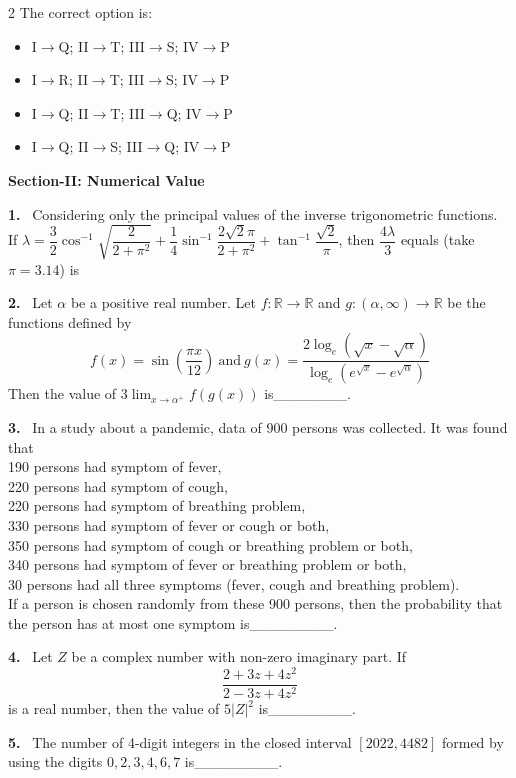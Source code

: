 \documentclass[10pt]{extarticle}
\newcommand{\sect}[1]{\par\smallskip\noindent\textbf{#1}\par}
\newcommand{\qn}[1]{\par\smallskip\noindent\textbf{#1.}~}
\newenvironment{qoptions}{\begin{itemize}[leftmargin=1.8em,itemsep=1pt,topsep=2pt,label={}]}{\end{itemize}}
\newcommand{\opt}[2]{\item[(#1)] #2}
\begin{document}
\begin{multicols}{2}
The correct option is:
\begin{qoptions}
\opt{A}{I$\to$Q; II$\to$T; III$\to$S; IV$\to$P}
\opt{B}{I$\to$R; II$\to$T; III$\to$S; IV$\to$P}
\opt{C}{I$\to$Q; II$\to$T; III$\to$Q; IV$\to$P}
\opt{D}{I$\to$Q; II$\to$S; III$\to$Q; IV$\to$P}
\end{qoptions}

\sect{Section-II: Numerical Value}

\qn{1} Considering only the principal values of the inverse trigonometric functions.\\
If $\lambda = \dfrac32\cos^{-1}\sqrt{\dfrac{2}{2+\pi^2}} + \dfrac14\sin^{-1}\dfrac{2\sqrt2\pi}{2+\pi^2} + \tan^{-1}\dfrac{\sqrt2}{\pi}$, then $\dfrac{4\lambda}{3}$ equals (take $\pi=3.14$) is

\qn{2} Let $\alpha$ be a positive real number. Let $f:\mathbb{R}\to\mathbb{R}$ and $g:(\alpha,\infty)\to\mathbb{R}$ be the functions defined by
$$f(x) = \sin\left(\dfrac{\pi x}{12}\right)\ \text{and}\ g(x) = \dfrac{2\log_e(\sqrt x-\sqrt\alpha)}{\log_e(e^{\sqrt x}-e^{\sqrt\alpha})}$$
Then the value of $3\displaystyle\lim_{x\to\alpha^+} f(g(x))$ is\_\_\_\_\_\_\_.

\qn{3} In a study about a pandemic, data of 900 persons was collected. It was found that\\
190 persons had symptom of fever,\\
220 persons had symptom of cough,\\
220 persons had symptom of breathing problem,\\
330 persons had symptom of fever or cough or both,\\
350 persons had symptom of cough or breathing problem or both,\\
340 persons had symptom of fever or breathing problem or both,\\
30 persons had all three symptoms (fever, cough and breathing problem).\\
If a person is chosen randomly from these 900 persons, then the probability that the person has at most one symptom is\_\_\_\_\_\_\_\_.

\qn{4} Let $Z$ be a complex number with non-zero imaginary part. If
$$\dfrac{2+3z+4z^2}{2-3z+4z^2}$$
is a real number, then the value of $5|Z|^2$ is\_\_\_\_\_\_\_\_.

\qn{5} The number of 4-digit integers in the closed interval $[2022,4482]$ formed by using the digits $0,2,3,4,6,7$ is\_\_\_\_\_\_\_\_.


\end{multicols}
\end{document}
